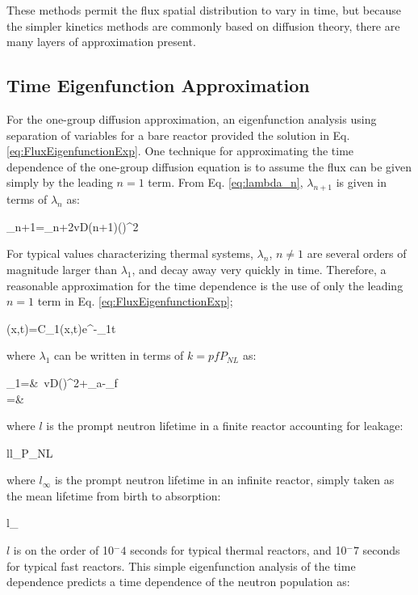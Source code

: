 These methods permit the flux spatial distribution to vary in time, but because the simpler kinetics methods are commonly based on diffusion theory, there are many layers of approximation present. 

\subsection{Time Eigenfunction Approximation}

For the one-group diffusion approximation, an eigenfunction analysis using separation of variables for a bare reactor provided the solution in Eq. \eqref{eq:FluxEigenfunctionExp}. One technique for approximating the time dependence of the one-group diffusion equation is to assume the flux can be given simply by the leading \(n=1\) term. From Eq. \eqref{eq:lambda_n}, \(\lambda_{n+1}\) is given in terms of \(\lambda_n\) as:

\beq
\lambda_{n+1}=\lambda_n+2vD(n+1)\left(\right)^2
\eeq

For typical values characterizing thermal systems, \(\lambda_{n}\), \(n\neq1\) are several orders of magnitude larger than \(\lambda_1\), and decay away very quickly in time. Therefore, a reasonable approximation for the time dependence is the use of only the leading \(n=1\) term in Eq. \eqref{eq:FluxEigenfunctionExp};

\beq
\phi(x,t)=C_1(x,t)e^{-\lambda_1t}
\eeq

where \(\lambda_1\) can be written in terms of \(k=pfP_{NL}\) as:

\beqa
\lambda_1=&\ v\left\lbrack D\left(\right)^2+\Sigma_a-\nu\Sigma_f\right\rbrack\\
=&\ 
\eeqa

where \(l\) is the prompt neutron lifetime in a finite reactor accounting for leakage:

\beq
l\equiv l_\infty P_{NL}
\eeq

where \(l_\infty\) is the prompt neutron lifetime in an infinite reactor, simply taken as the mean lifetime from birth to absorption:

\beq
l_\infty\equiv{}
\eeq

\(l\) is on the order of 10$^-4$ seconds for typical thermal reactors, and 10$^-7$ seconds for typical fast reactors. This simple eigenfunction analysis of the time dependence predicts a time dependence of the neutron population as:

